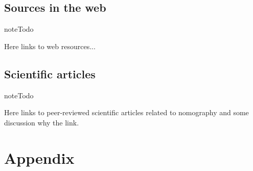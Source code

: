 \documentclass[a4paper,11pt,english]{sphinxmanual}
\begin{document}
\section{Sources in the web}
\label{literature/literature:sources-in-the-web}
\begin{notice}{note}{Todo}

Here links to web resources...
\end{notice}


\section{Scientific articles}
\label{literature/literature:scientific-articles}
\begin{notice}{note}{Todo}

Here links to peer-reviewed scientific articles related to nomography and some discussion why the link.
\end{notice}


\chapter{Appendix}
\label{appendix/appendices:appendix}\label{appendix/appendices::doc}
\end{document}
